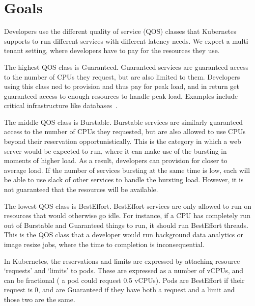 \section{Goals}
\label{s:goals}


Developers use the different quality of service (QOS) classes that Kubernetes
supports to run different services with different latency needs. We expect a
multi-tenant setting, where developers have to pay for the resources they use.

The highest QOS class is Guaranteed. Guaranteed services are guaranteed access
to the number of CPUs they request, but are also limited to them. Developers
using this class ned to provision and thus pay for peak load, and in return get
guaranteed access to enough resources to handle peak load. Examples include
critical infrastructure like databases~\cite{reddit-kub-qos}.

The middle QOS class is Burstable. Burstable services are similarly guaranteed
access to the number of CPUs they requested, but are also allowed to use CPUs
beyond their reservation opportunistically. This is the category in which a web
server would be expected to run, where it can make use of the bursting in
moments of higher load. As a result, developers can provision for closer to
average load. If the number of services bursting at the same time is low, each
will be able to use slack of other services to handle the bursting load.
However, it is not guaranteed that the resources will be available.

The lowest QOS class is BestEffort. BestEffort services are only allowed to run
on resources that would otherwise go idle. For instance, if a CPU has completely
run out of Burstable and Guaranteed things to run, it should run BestEffort
threads. This is the QOS class that a developer would run background data
analytics or image resize jobs, where the time to completion is inconsequential.

In Kubernetes, the reservations and limits are expressed by attaching resource
`requests' and `limits' to pods. These are expressed as a number of vCPUs, and
can be fractional (\ie{} a pod could request 0.5 vCPUs). Pods are BestEffort if
their request is 0, and are Guaranteed if they have both a request and a limit
and those two are the same.

